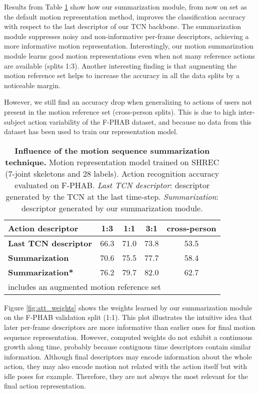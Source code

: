 \documentclass[letterpaper, 10 pt, conference]{ieeeconf}
\begin{document}
Results from Table \ref{tab:summ_comp} show how our summarization module, from now on set as the default motion representation method, improves the classification accuracy with respect to the last descriptor of our TCN backbone. The summarization module suppresses noisy and non-informative per-frame descriptors, achieving a more informative motion representation. Interestingly, our motion summarization module learns good motion representations even when not many reference actions are available (splits 1:3). Another interesting finding is that augmenting the motion reference set helps to increase the accuracy in all the data splits by a noticeable margin.

However, we still find an accuracy drop when generalizing to actions of users not present in the motion reference set (cross-person splits). This is due to high inter-subject action variability of the F-PHAB dataset, and because no data from this dataset has been used to train our representation model.



\begin{table}[!htb]
\centering
\begin{tabular}{|l|c|c|c|c|}
\hline
\textbf{Action descriptor} & \textbf{1:3} & \textbf{1:1} & \textbf{3:1} & \textbf{cross-person} \\ \hline
\textbf{Last TCN descriptor} & 66.3 & 71.0 & 73.8 & 53.5 \\ \hline
\textbf{Summarization} & 70.6 & 75.5 & 77.7 & 58.4 \\ \hline
\textbf{Summarization*} & 76.2 & 79.7 & 82.0 & 62.7 \\ \hline
\multicolumn{5}{l}{\footnotesize  includes an augmented motion reference set} \\
\end{tabular}
\caption{\textbf{Influence of the motion sequence summarization technique.} Motion representation model trained on SHREC (7-joint skeletons and 28 labels). Action recognition accuracy evaluated on F-PHAB. \textit{Last TCN descriptor}: descriptor generated by the TCN at the last time-step. \textit{Summarization}: descriptor generated by our summarization module.} 
\label{tab:summ_comp}
\end{table}



Figure \ref{fig:att_weights} shows the weights learned by our summarization module on the F-PHAB validation split (1:1). 
This plot illustrates the intuitive idea that later per-frame descriptors are more informative than earlier ones for final motion sequence representation.
However, computed weights do not exhibit a continuous growth along time, probably because contiguous time descriptors contain similar information. Although final descriptors may encode information about the whole action, they may also encode motion not related with the action itself but with idle poses for example. Therefore, they are not always the most relevant for the final action representation. 
\end{document}
